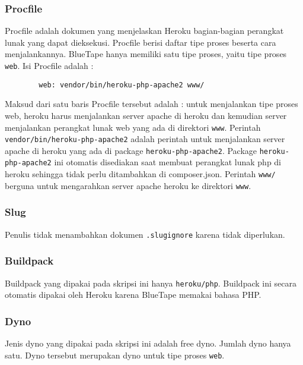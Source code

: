	\subsubsection{Procfile}
		Procfile adalah dokumen yang menjelaskan Heroku bagian-bagian perangkat lunak yang dapat dieksekusi. Procfile berisi daftar tipe proses beserta cara menjalankannya. BlueTape hanya memiliki satu tipe proses, yaitu tipe proses \texttt{web}. Isi Procfile adalah :
		\begin{lstlisting}
		web: vendor/bin/heroku-php-apache2 www/
		\end{lstlisting}
		
		Maksud dari satu baris Procfile tersebut adalah : untuk menjalankan tipe proses web, heroku harus menjalankan server apache di heroku dan kemudian server menjalankan perangkat lunak web yang ada di direktori \texttt{www}. Perintah \texttt{vendor/bin/heroku-php-apache2} adalah perintah untuk menjalankan server apache di heroku yang ada di package \texttt{heroku-php-apache2}. Package \texttt{heroku-php-apache2} ini otomatis disediakan saat membuat perangkat lunak php di heroku sehingga tidak perlu ditambahkan di composer.json. Perintah \texttt{www/} berguna untuk mengarahkan server apache heroku ke direktori \texttt{www}.
		
	\subsubsection{Slug}
		Penulis tidak menambahkan dokumen \texttt{.slugignore} karena tidak diperlukan.
		
	\subsubsection{Buildpack}
		Buildpack yang dipakai pada skripsi ini hanya \texttt{heroku/php}. Buildpack ini secara otomatis dipakai oleh Heroku karena BlueTape memakai bahasa PHP.
		
	\subsubsection{Dyno}
		Jenis dyno yang dipakai pada skripsi ini adalah free dyno. Jumlah dyno hanya satu. Dyno tersebut merupakan dyno untuk tipe proses \texttt{web}.
		
